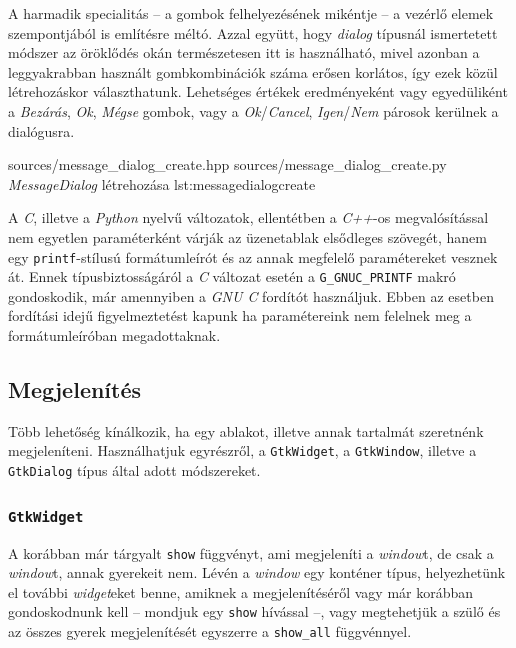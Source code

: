 A harmadik specialitás -- a gombok felhelyezésének mikéntje -- a vezérlő elemek szempontjából is említésre méltó. Azzal együtt, hogy \textit{dialog} típusnál ismertetett módszer az öröklődés okán természetesen itt is használható, mivel azonban a leggyakrabban használt gombkombinációk száma erősen korlátos, így ezek közül létrehozáskor választhatunk. Lehetséges értékek eredményeként vagy egyedüliként a \textit{Bezárás}, \textit{Ok}, \textit{Mégse} gombok, vagy a \textit{Ok}/\textit{Cancel}, \textit{Igen}/\textit{Nem} párosok kerülnek a dialógusra.

{sources/message_dialog_create.hpp}
{sources/message_dialog_create.py}
{\textit{MessageDialog} létrehozása}
{lst:messagedialogcreate}

A \textit{C}, illetve a \textit{Python} nyelvű változatok, ellentétben a \textit{C++}-os megvalósítással nem egyetlen paraméterként várják az üzenetablak elsődleges szövegét, hanem egy \texttt{printf}-stílusú formátumleírót és az annak megfelelő paramétereket vesznek át. Ennek típusbiztosságáról a \textit{C} változat esetén a \texttt{G\_GNUC\_PRINTF} makró gondoskodik, már amennyiben a \textit{GNU C} fordítót használjuk. Ebben az esetben fordítási idejű figyelmeztetést kapunk ha paramétereink nem felelnek meg a formátumleíróban megadottaknak.

\subsection{Megjelenítés}

Több lehetőség kínálkozik, ha egy ablakot, illetve annak tartalmát szeretnénk megjeleníteni. Használhatjuk egyrészről, a \texttt{GtkWidget}, a \texttt{GtkWindow}, illetve a \texttt{GtkDialog} típus által adott módszereket.

\subsubsection{\texttt{GtkWidget}}

A korábban már tárgyalt \texttt{show} függvényt, ami megjeleníti a \textit{window}t, de csak a \textit{window}t, annak gyerekeit nem. Lévén a \textit{window} egy konténer típus, helyezhetünk el további \textit{widget}eket benne, amiknek a megjelenítéséről vagy már korábban gondoskodnunk kell -- mondjuk egy \texttt{show} hívással --, vagy megtehetjük a szülő és az összes gyerek megjelenítését egyszerre a \texttt{show\_all} függvénnyel.


